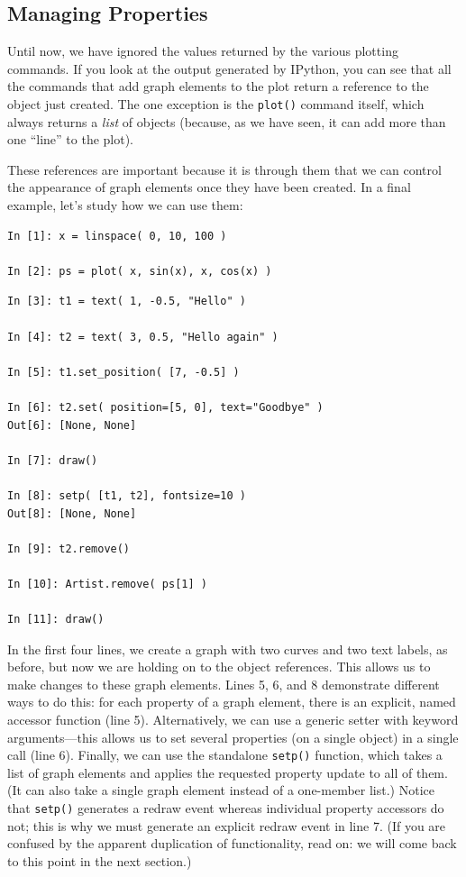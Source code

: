 \subsection{Managing Properties}
Until now, we have ignored the values returned by the various plotting
commands. If you look at the output generated by IPython, you can see
that all the commands that add graph elements to the plot return a
reference to the object just created. The one exception is the
\texttt{plot()} command  itself, which always returns a \emph{list} of
objects (because, as we have seen, it can add more than one ``line''
to the plot). 

These references are important because it is through them that we can
control the appearance of graph elements once they have been created.
In a final example, let's study how we can use them:

\begin{verbatim}
In [1]: x = linspace( 0, 10, 100 )

In [2]: ps = plot( x, sin(x), x, cos(x) )
\end{verbatim}

\begin{verbatim}
In [3]: t1 = text( 1, -0.5, "Hello" )

In [4]: t2 = text( 3, 0.5, "Hello again" )

In [5]: t1.set_position( [7, -0.5] )

In [6]: t2.set( position=[5, 0], text="Goodbye" )
Out[6]: [None, None]

In [7]: draw()

In [8]: setp( [t1, t2], fontsize=10 )
Out[8]: [None, None]

In [9]: t2.remove()

In [10]: Artist.remove( ps[1] )

In [11]: draw()
\end{verbatim} 

In the first four lines, we create a graph with two curves and two
text labels, as before, but now we are holding on to the object
references. This allows us to make changes to these graph elements.
Lines 5, 6, and 8 demonstrate different ways to do this: for each
property of a graph element, there is an explicit, named accessor
function (line 5). Alternatively, we can use a generic setter with
keyword arguments---this allows us to set several properties (on a
single object) in a single call (line 6). Finally, we can use the
standalone \texttt{setp()} function,  which takes a list of graph
elements and applies the requested property update to all of them.
(It can also take a single graph element instead of a one-member
list.) Notice that \texttt{setp()} generates a redraw event whereas
individual property accessors do not; this is why we must generate an
explicit redraw event in line 7. (If you are confused by the apparent
duplication of functionality, read on: we will come back to this point
in the next section.)


